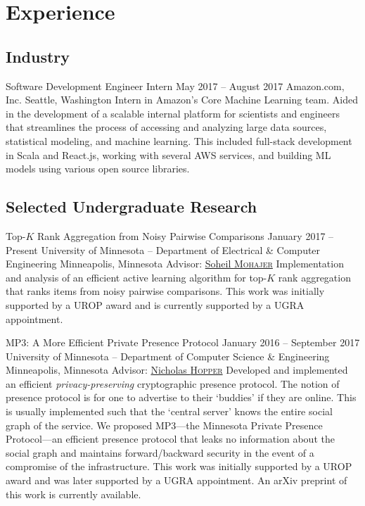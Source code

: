 \section{Experience}
\subsection{Industry}
\block
  {Software Development Engineer Intern}
  {May 2017 -- August 2017}
  {Amazon.com, Inc.}
  {Seattle, Washington}
  {}
  {
    Intern in Amazon's Core Machine Learning team. Aided in the development
    of a scalable internal platform for scientists and engineers that
    streamlines the process of accessing and analyzing large data sources,
    statistical modeling, and machine learning. This included full-stack
    development in Scala and React.js, working with several AWS services, and
    building ML models using various open source libraries.
  }

\subsection{Selected Undergraduate Research}
\block
  {Top-\boldmath$K$ Rank Aggregation from Noisy Pairwise Comparisons}
  {January 2017 -- Present}
  {University of Minnesota -- Department of Electrical \& Computer Engineering}
  {Minneapolis, Minnesota}
  {Advisor: \href{\soheil}{Soheil \textsc{Mohajer}}}
  {
    Implementation and analysis of an efficient active learning algorithm for
    top-$K$ rank aggregation that ranks items from noisy pairwise comparisons.
    This work was initially supported by a UROP award and is currently supported
    by a UGRA appointment.
  }

\block
  {MP3: A More Efficient Private Presence Protocol}
  {January 2016 -- September 2017}
  {University of Minnesota -- Department of Computer Science \& Engineering}
  {Minneapolis, Minnesota}
  {Advisor: \href{\hoppernj}{Nicholas \textsc{Hopper}}}
  {
    Developed and implemented an efficient \emph{privacy-preserving}
    cryptographic presence protocol. The notion of presence protocol is for one
    to advertise to their `buddies' if they are online. This is usually
    implemented such that the `central server' knows the entire social graph of
    the service. We proposed MP3---the Minnesota Private Presence Protocol---an
    efficient presence protocol that leaks no information about the social graph
    and maintains forward/backward security in the event of a compromise of the
    infrastructure.  This work was initially supported by a UROP award and was
    later supported by a UGRA appointment. An arXiv preprint of this work is
    currently available.
  }

